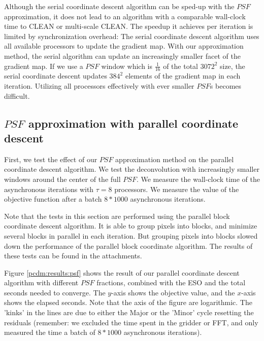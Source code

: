 Although the serial coordinate descent algorithm can be sped-up with the $PSF$ approximation, it does not lead to an algorithm with a comparable wall-clock time to CLEAN or multi-scale CLEAN. The speedup it achieves per iteration is limited by synchronization overhead: The serial coordinate descent algorithm uses all available processors to update the gradient map. With our approximation method, the serial algorithm can update an increasingly smaller facet of the gradient map. If we use a $PSF$ window which is $\frac{1}{16}$ of the total $3072^2$ size, the serial coordinate descent updates $384^2$ elements of the gradient map in each iteration. Utilizing all processors effectively with ever smaller $PSF$s becomes difficult.


\subsection{$PSF$ approximation with parallel coordinate descent}\label{pcdm:results}
First, we test the effect of our $PSF$ approximation method on the parallel coordinate descent algorithm. We test the deconvolution with increasingly smaller windows around the center of the full $PSF$. We measure the wall-clock time of the asynchronous iterations with $\tau = 8$ processors. We measure the value of the objective function after a batch $8 * 1000$ asynchronous iterations.

Note that the tests in this section are performed using the parallel block coordinate descent algorithm. It is able to group pixels into blocks, and minimize several blocks in parallel in each iteration. But grouping pixels into blocks slowed down the performance of the parallel block coordinate algorithm. The results of these tests can be found in the attachments.

Figure \ref{pcdm:results:psf} shows the result of our parallel coordinate descent algorithm with different $PSF$ fractions, combined with the ESO and the total seconds needed to converge. The $y$-axis shows the objective value, and the $x$-axis shows the elapsed seconds. Note that the axis of the figure are logarithmic. The 'kinks' in the lines are due to either the Major or the 'Minor' cycle resetting the residuals (remember: we excluded the time spent in the gridder or FFT, and only measured the time a batch of $8 * 1000$ asynchronous iterations).

